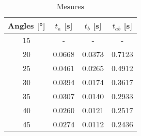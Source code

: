 \begin{table}
\centering
\begin{tabular}{|c|c|c|c|}
\hline
Angles [°] & $t_a$ [s] & $t_b$ [s] & $t_{ab}$ [s] \\
\hline
15 & - & - & - \\
\hline
20 & 0.0668 & 0.0373 & 0.7123 \\
\hline
25 & 0.0461 & 0.0265 & 0.4912 \\
\hline
30 & 0.0394 & 0.0174 & 0.3617 \\
\hline
35 & 0.0307 & 0.0140 & 0.2933 \\
\hline
40 & 0.0260 & 0.0121 & 0.2517 \\
\hline
45 & 0.0274 & 0.0112 & 0.2436 \\
\hline
\end{tabular}
\caption{Mesures}
\label{table:mesurebb}
\end{table}
